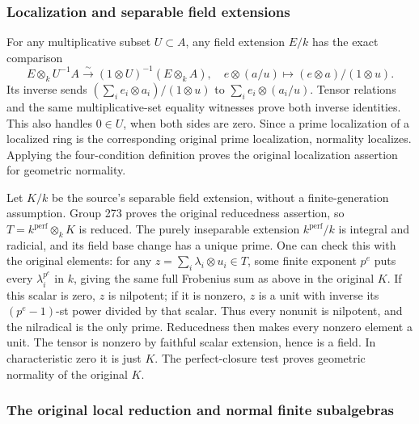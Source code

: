\subsubsection{Localization and separable field extensions}\label{localization-and-separable-field-extensions}

For any multiplicative subset \(U\subset A\), any field extension \(E/k\) has the exact comparison \[
 E\otimes_kU^{-1}A\xrightarrow{\sim}(1\otimes U)^{-1}(E\otimes_kA),
 \quad e\otimes(a/u)\longmapsto(e\otimes a)/(1\otimes u).
\] Its inverse sends \((\sum_i e_i\otimes a_i)/(1\otimes u)\) to \(\sum_i e_i\otimes(a_i/u)\). Tensor relations and the same multiplicative-set equality witnesses prove both inverse identities. This also handles \(0\in U\), when both sides are zero. Since a prime localization of a localized ring is the corresponding original prime localization, normality localizes. Applying the four-condition definition proves the original localization assertion for geometric normality.

Let \(K/k\) be the source's separable field extension, without a finite-generation assumption. Group 273 proves the original reducedness assertion, so \(T=k^{\mathrm{perf}}\otimes_kK\) is reduced. The purely inseparable extension \(k^{\mathrm{perf}}/k\) is integral and radicial, and its field base change has a unique prime. One can check this with the original elements: for any \(z=\sum_i\lambda_i\otimes u_i\in T\), some finite exponent \(p^e\) puts every \(\lambda_i^{p^e}\) in \(k\), giving the same full Frobenius sum as above in the original \(K\). If this scalar is zero, \(z\) is nilpotent; if it is nonzero, \(z\) is a unit with inverse its \((p^e-1)\)-st power divided by that scalar. Thus every nonunit is nilpotent, and the nilradical is the only prime. Reducedness then makes every nonzero element a unit. The tensor is nonzero by faithful scalar extension, hence is a field. In characteristic zero it is just \(K\). The perfect-closure test proves geometric normality of the original \(K\).

\subsubsection{The original local reduction and normal finite subalgebras}\label{the-original-local-reduction-and-normal-finite-subalgebras}

